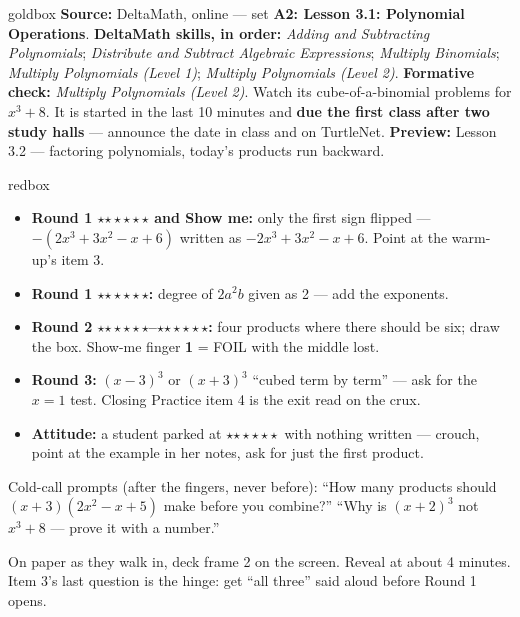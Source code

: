 \documentclass[10pt]{article}
\newcommand{\rung}[1]{{\color{goldacc}\ifcase#1\or$\star$\or$\star\star$\or$\star\star\star$\fi}}
\begin{document}
\boxguard
\begin{skillbox}{goldbox}
\textbf{Source:} DeltaMath, online --- set \textbf{A2: Lesson 3.1: Polynomial Operations}. \textbf{DeltaMath skills, in order:} \emph{Adding and Subtracting Polynomials}; \emph{Distribute and Subtract Algebraic Expressions}; \emph{Multiply Binomials}; \emph{Multiply Polynomials (Level 1)}; \emph{Multiply Polynomials (Level 2)}. \textbf{Formative check:} \emph{Multiply Polynomials (Level 2)}. Watch its cube-of-a-binomial problems for $x^3+8$. It is started in the last 10 minutes and \textbf{due the first
class after two study halls} --- announce the date in class and on TurtleNet.
\textbf{Preview:} Lesson 3.2 --- factoring polynomials, today's products run backward.
\end{skillbox}

\boxguard
\begin{skillbox}{redbox}
\begin{itemize}[leftmargin=1.2em, nosep]
  \item \textbf{Round 1 \rung2 and Show me:} only the first sign flipped ---
        $-(2x^3+3x^2-x+6)$ written as $-2x^3+3x^2-x+6$. Point at the warm-up's item 3.
  \item \textbf{Round 1 \rung3:} degree of $2a^2b$ given as 2 --- add the exponents.
  \item \textbf{Round 2 \rung2--\rung3:} four products where there should be six; draw the box.
        Show-me finger \textbf{1} = FOIL with the middle lost.
  \item \textbf{Round 3:} $(x-3)^3$ or $(x+3)^3$ ``cubed term by term'' --- ask for the
        $x=1$ test. Closing Practice item 4 is the exit read on the crux.
  \item \textbf{Attitude:} a student parked at \rung1\ with nothing written --- crouch, point at
        the example in her notes, ask for just the first product.
\end{itemize}
Cold-call prompts (after the fingers, never before): ``How many products should
$(x+3)(2x^2-x+5)$ make before you combine?'' \; ``Why is $(x+2)^3$ not $x^3+8$ --- prove it
with a number.''
\end{skillbox}

\begin{teachernote}[Warm-Up]
On paper as they walk in, deck frame 2 on the screen. Reveal at about 4 minutes. Item 3's last
question is the hinge: get ``all three'' said aloud before Round 1 opens.
\end{teachernote}
\end{document}

